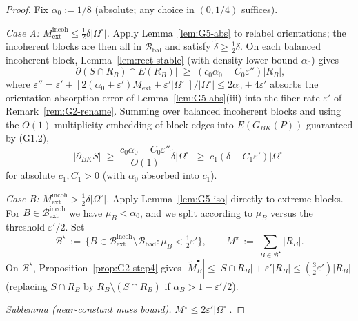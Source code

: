 \begin{proof}
Fix $\alpha_0:=1/8$ (absolute; any choice in $(0,1/4)$ suffices).

\emph{Case A: $M_{\mathrm{ext}}^{\mathrm{incoh}}\le\tfrac12\delta|\Omega^\circ|$.}
Apply Lemma~\ref{lem:G5-abs} to relabel orientations; the incoherent
blocks are then all in $\mathcal B_{\mathrm{bal}}$ and satisfy
$\tilde\delta\ge\tfrac12\delta$. On each balanced incoherent block,
Lemma~\ref{lem:rect-stable} (with density lower bound $\alpha_0$) gives
\[
|\partial(S\cap R_B)\cap E(R_B)|\;\ge\;(c_0\alpha_0-C_0\varepsilon'')|R_B|,
\]
where $\varepsilon''=\varepsilon'+[2(\alpha_0+\varepsilon')M_{\mathrm{ext}}+\varepsilon'|\Omega^\circ|]/|\Omega^\circ|\le 2\alpha_0+4\varepsilon'$
absorbs the orientation-absorption error of Lemma~\ref{lem:G5-abs}(iii)
into the fiber-rate $\varepsilon'$ of Remark~\ref{rem:G2-rename}. Summing
over balanced incoherent blocks and using the $O(1)$-multiplicity
embedding of block edges into $E(G_{BK}(P))$ guaranteed by (G1.2),
\begin{equation}\label{eq:G5-caseA}
|\partial_{BK}S|\;\ge\;\frac{c_0\alpha_0-C_0\varepsilon''}{O(1)}\tilde\delta|\Omega^\circ|
\;\ge\;c_1(\delta-C_1\varepsilon')|\Omega^\circ|
\end{equation}
for absolute $c_1,C_1>0$ (with $\alpha_0$ absorbed into $c_1$).

\emph{Case B: $M_{\mathrm{ext}}^{\mathrm{incoh}}>\tfrac12\delta|\Omega^\circ|$.}
Apply Lemma~\ref{lem:G5-iso} directly to extreme blocks. For
$B\in\mathcal B_{\mathrm{ext}}^{\mathrm{incoh}}$ we have $\mu_B<\alpha_0$,
and we split according to $\mu_B$ versus the threshold $\varepsilon'/2$.
Set
\[
\mathcal B^\star\,:=\,\bigl\{B\in\mathcal B_{\mathrm{ext}}^{\mathrm{incoh}}\setminus\mathcal B_{\mathrm{bad}}
:\mu_B<\tfrac12\varepsilon'\bigr\},\qquad
M^\star\,:=\,\sum_{B\in\mathcal B^\star}|R_B|.
\]
On $\mathcal B^\star$, Proposition~\ref{prop:G2-step4} gives
$|\tilde M_B^\bullet|\le|S\cap R_B|+\varepsilon'|R_B|\le(\tfrac32\varepsilon')|R_B|$
(replacing $S\cap R_B$ by $R_B\setminus(S\cap R_B)$ if $\alpha_B>1-\varepsilon'/2$).

\medskip
\noindent\emph{Sublemma (near-constant mass bound).} $M^\star\le 2\varepsilon'|\Omega^\circ|$.


\end{proof}
